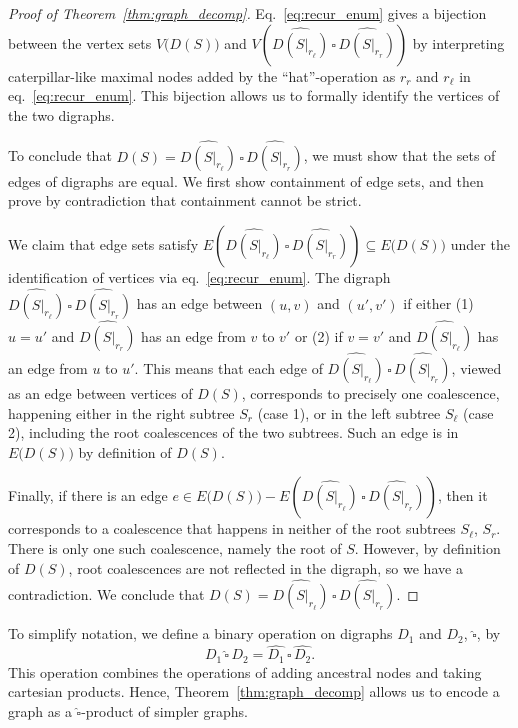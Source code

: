 \documentclass[10pt]{article}
\newcommand*{\cp}[2]{#1 \,\square\, #2}
\newcommand{\house}{\,\widehat{\square}\,}
\newcommand*{\cphat}[2]{#1 \house #2}
\begin{document}
\begin{proof}[Proof of Theorem~\ref{thm:graph_decomp}]
Eq.~\ref{eq:recur_enum} gives a bijection between the vertex sets $V\big(D(S)\big)$ and $V\left(\cp{\widehat{D(S|_{r_\ell})}}{\widehat{D(S|_{r_r})}}\right)$ by interpreting caterpillar-like maximal nodes added by the ``hat''-operation as $r_r$ and $r_\ell$ in eq.~\ref{eq:recur_enum}. This bijection allows us to formally identify the vertices of the two digraphs.

To conclude that $D(S) = \cp{\widehat{D(S|_{r_\ell})}}{\widehat{D(S|_{r_r})}}$, we must show that the sets of edges of digraphs are equal. We first show containment of edge sets, and then prove by contradiction that containment cannot be strict.

We claim that edge sets satisfy $E\left(\cp{\widehat{D(S|_{r_\ell})}}{\widehat{D(S|_{r_r})}}\right) \subseteq E\big(D(S)\big)$ under the identification of vertices via eq.~\ref{eq:recur_enum}. The digraph $\cp{\widehat{D(S|_{r_\ell})}}{\widehat{D(S|_{r_r})}}$ has an edge between $(u,v)$ and $(u',v')$ if either (1) $u=u'$ and $\widehat{D(S|_{r_r})}$ has an edge from $v$ to $v'$ or (2) if $v = v'$ and $\widehat{D(S|_{r_\ell})}$ has an edge from $u$ to $u'$. This means that each edge of $\cp{\widehat{D(S|_{r_\ell})}}{\widehat{D(S|_{r_r})}}$, viewed as an edge between vertices of $D(S)$, corresponds to precisely one coalescence, happening either in the right subtree $S_r$ (case 1), or in the left subtree $S_\ell$ (case 2), including the root coalescences of the two subtrees. Such an edge is in $E\big(D(S) \big)$ by definition of $D(S)$.

Finally, if there is an edge $e \in E\big(D(S)\big) - E\left(\cp{\widehat{D(S|_{r_\ell})}}{\widehat{D(S|_{r_r})}}\right)$, then it corresponds to a coalescence that happens in neither of the root subtrees $S_\ell$, $S_r$. There is only one such coalescence, namely the root of $S$. However, by definition of $D(S)$, root coalescences are not reflected in the digraph, so we have a contradiction. We conclude that $D(S) = \cp{\widehat{D(S|_{r_\ell})}}{\widehat{D(S|_{r_r})}}$.
\end{proof}

To simplify notation, we define a binary operation on digraphs $D_1$ and $D_2$, $\widehat\square$, by \[\cphat{D_1}{D_2} = \cp{\widehat{D_1}}{\widehat{D_2}}.\]
This operation combines the operations of adding ancestral nodes and taking cartesian products. Hence, Theorem~\ref{thm:graph_decomp} allows us to encode a graph as a $\widehat\square$-product of simpler graphs. 
\end{document}
